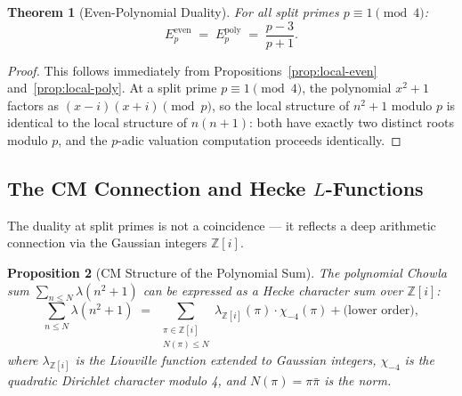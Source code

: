 \documentclass[11pt,a4paper]{article}
\theoremstyle{plain}
\newtheorem{theorem}{Theorem}[section]
\newtheorem{proposition}[theorem]{Proposition}
\theoremstyle{definition}
\begin{document}
\begin{theorem}[Even-Polynomial Duality]\label{thm:duality}
For all split primes $p \equiv 1 \pmod{4}$:
\begin{equation}\label{eq:duality}
E_p^{\mathrm{even}} \;=\; E_p^{\mathrm{poly}} \;=\; \frac{p-3}{p+1}.
\end{equation}
\end{theorem}

\begin{proof}
This follows immediately from Propositions~\ref{prop:local-even} and~\ref{prop:local-poly}. At a split prime $p \equiv 1 \pmod{4}$, the polynomial $x^2 + 1$ factors as $(x - i)(x + i) \pmod{p}$, so the local structure of $n^2 + 1$ modulo $p$ is identical to the local structure of $n(n+1)$: both have exactly two distinct roots modulo $p$, and the $p$-adic valuation computation proceeds identically.
\end{proof}

\subsection{The CM Connection and Hecke $L$-Functions}

The duality at split primes is not a coincidence --- it reflects a deep arithmetic connection via the Gaussian integers $\mathbb{Z}[i]$.

\begin{proposition}[CM Structure of the Polynomial Sum]\label{prop:cm-structure}
The polynomial Chowla sum $\sum_{n \leq N} \lambda(n^2+1)$ can be expressed as a Hecke character sum over $\mathbb{Z}[i]$:
\begin{equation}\label{eq:cm-sum}
\sum_{n \leq N} \lambda(n^2+1) \;=\; \sum_{\substack{\pi \in \mathbb{Z}[i] \\ N(\pi) \leq N}} \lambda_{\mathbb{Z}[i]}(\pi) \cdot \chi_{-4}(\pi) + \text{(lower order)},
\end{equation}
where $\lambda_{\mathbb{Z}[i]}$ is the Liouville function extended to Gaussian integers, $\chi_{-4}$ is the quadratic Dirichlet character modulo 4, and $N(\pi) = \pi \bar{\pi}$ is the norm.
\end{proposition}
\end{document}
